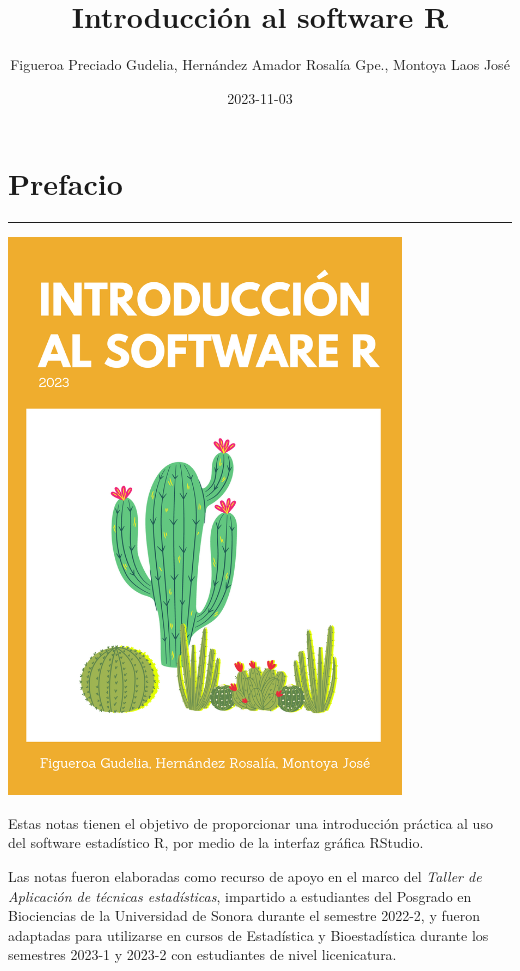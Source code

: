 \documentclass[
]{book}
\title{Introducción al software R}
\author{Figueroa Preciado Gudelia,
Hernández Amador Rosalía Gpe., Montoya Laos José}
\date{2023-11-03}
\begin{document}
\maketitle

{
\setcounter{tocdepth}{1}
\tableofcontents
}
\hypertarget{prefacio}{%
\chapter*{Prefacio}\label{prefacio}}

\begin{center}\rule{0.5\linewidth}{0.5pt}\end{center}

\includegraphics[width=4.10417in,height=\textheight]{portada.png}

Estas notas tienen el objetivo de proporcionar una introducción práctica al uso del software estadístico R, por medio de la interfaz gráfica RStudio.

Las notas fueron elaboradas como recurso de apoyo en el marco del \emph{Taller de Aplicación de técnicas estadísticas}, impartido a estudiantes del Posgrado en Biociencias de la Universidad de Sonora durante el semestre 2022-2, y fueron adaptadas para utilizarse en cursos de Estadística y Bioestadística durante los semestres 2023-1 y 2023-2 con estudiantes de nivel licenicatura.
\end{document}
